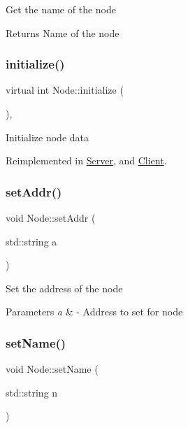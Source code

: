 Get the name of the node

\begin{DoxyReturn}{Returns}
Name of the node 
\end{DoxyReturn}
\mbox{\label{classNode_acfbc12d3b7d414fb12811041b04a1809}} 
\subsubsection{\texorpdfstring{initialize()}{initialize()}}
{\footnotesize\ttfamily virtual int Node\+::initialize (\begin{DoxyParamCaption}{ }\end{DoxyParamCaption})\hspace{0.3cm}{\ttfamily [inline]}, {\ttfamily [virtual]}}

Initialize node data 

Reimplemented in \mbox{\hyperlink{classServer_ae94d08657f48a3b51b411463f1137375}{Server}}, and \mbox{\hyperlink{classClient_a5de857af6e3c568925ecd342314617d7}{Client}}.

\mbox{\label{classNode_a17aec62f8f89db9e1d1a4047e3e97256}} 
\subsubsection{\texorpdfstring{set\+Addr()}{setAddr()}}
{\footnotesize\ttfamily void Node\+::set\+Addr (\begin{DoxyParamCaption}\item[{std\+::string}]{a }\end{DoxyParamCaption})\hspace{0.3cm}{\ttfamily [inline]}}

Set the address of the node


\begin{DoxyParams}{Parameters}
{\em a} & -\/ Address to set for node \\
\hline
\end{DoxyParams}
\mbox{\label{classNode_af79916b6bb2580b7cf9397bdeb172988}} 
\subsubsection{\texorpdfstring{set\+Name()}{setName()}}
{\footnotesize\ttfamily void Node\+::set\+Name (\begin{DoxyParamCaption}\item[{std\+::string}]{n }\end{DoxyParamCaption})\hspace{0.3cm}{\ttfamily [inline]}}

